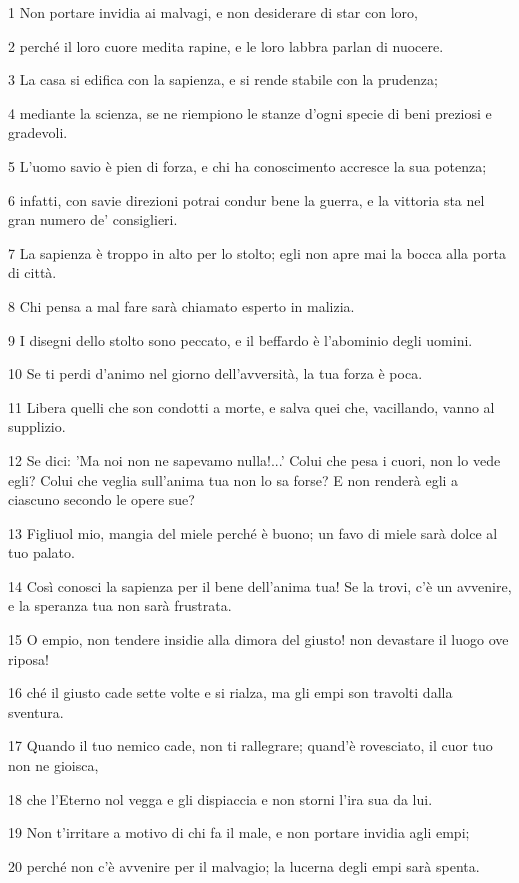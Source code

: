 \par 1 Non portare invidia ai malvagi, e non desiderare di star con loro,
\par 2 perché il loro cuore medita rapine, e le loro labbra parlan di nuocere.
\par 3 La casa si edifica con la sapienza, e si rende stabile con la prudenza;
\par 4 mediante la scienza, se ne riempiono le stanze d'ogni specie di beni preziosi e gradevoli.
\par 5 L'uomo savio è pien di forza, e chi ha conoscimento accresce la sua potenza;
\par 6 infatti, con savie direzioni potrai condur bene la guerra, e la vittoria sta nel gran numero de' consiglieri.
\par 7 La sapienza è troppo in alto per lo stolto; egli non apre mai la bocca alla porta di città.
\par 8 Chi pensa a mal fare sarà chiamato esperto in malizia.
\par 9 I disegni dello stolto sono peccato, e il beffardo è l'abominio degli uomini.
\par 10 Se ti perdi d'animo nel giorno dell'avversità, la tua forza è poca.
\par 11 Libera quelli che son condotti a morte, e salva quei che, vacillando, vanno al supplizio.
\par 12 Se dici: 'Ma noi non ne sapevamo nulla!...' Colui che pesa i cuori, non lo vede egli? Colui che veglia sull'anima tua non lo sa forse? E non renderà egli a ciascuno secondo le opere sue?
\par 13 Figliuol mio, mangia del miele perché è buono; un favo di miele sarà dolce al tuo palato.
\par 14 Così conosci la sapienza per il bene dell'anima tua! Se la trovi, c'è un avvenire, e la speranza tua non sarà frustrata.
\par 15 O empio, non tendere insidie alla dimora del giusto! non devastare il luogo ove riposa!
\par 16 ché il giusto cade sette volte e si rialza, ma gli empi son travolti dalla sventura.
\par 17 Quando il tuo nemico cade, non ti rallegrare; quand'è rovesciato, il cuor tuo non ne gioisca,
\par 18 che l'Eterno nol vegga e gli dispiaccia e non storni l'ira sua da lui.
\par 19 Non t'irritare a motivo di chi fa il male, e non portare invidia agli empi;
\par 20 perché non c'è avvenire per il malvagio; la lucerna degli empi sarà spenta.
